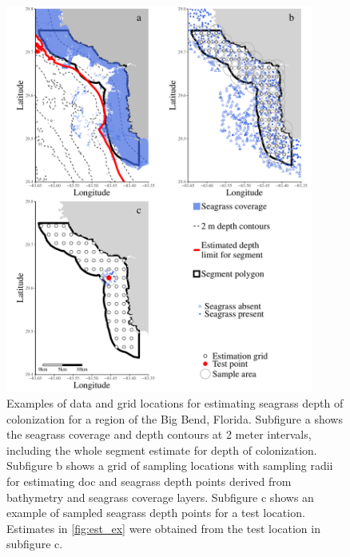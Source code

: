 \documentclass[letterpaper,12pt,oneside]{article}\usepackage[]{graphicx}\usepackage[]{color}
\begin{document}
\begin{figure}
\centering
\includegraphics[width=0.9\textwidth]{figs/Fig1.pdf}
\caption{Examples of data and grid locations for estimating seagrass depth of colonization for a region of the Big Bend, Florida.  Subfigure a shows the seagrass coverage and depth contours at 2 meter intervals, including the whole segment estimate for depth of colonization. Subfigure b shows a grid of sampling locations with sampling radii for estimating \ac{doc} and seagrass depth points derived from bathymetry and seagrass coverage layers.  Subfigure c shows an example of sampled seagrass depth points for a test location.  Estimates in \cref{fig:est_ex} were obtained from the test location in subfigure c.}
\label{fig:buff_ex}
\end{figure}
\end{document}
